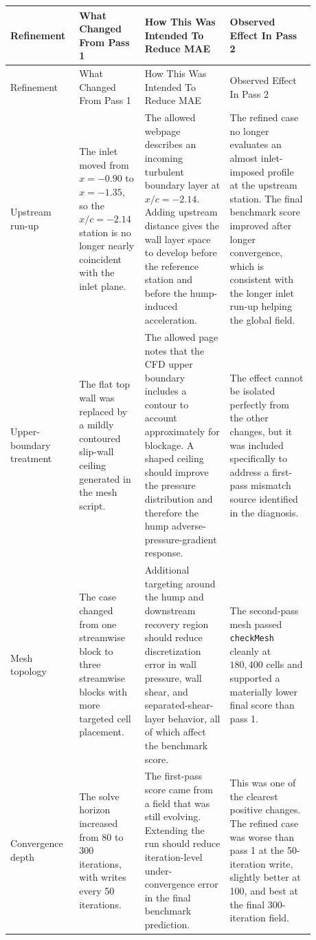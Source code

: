 \documentclass[11pt]{article}
\begin{document}
\begin{longtable}{p{0.18\linewidth} p{0.18\linewidth} p{0.26\linewidth} p{0.26\linewidth}}
\toprule
Refinement & What Changed From Pass 1 & How This Was Intended To Reduce MAE & Observed Effect In Pass 2 \\
\midrule
\endfirsthead
\toprule
Refinement & What Changed From Pass 1 & How This Was Intended To Reduce MAE & Observed Effect In Pass 2 \\
\midrule
\endhead
Upstream run-up & The inlet moved from \(x=-0.90\) to \(x=-1.35\), so the \(x/c=-2.14\) station is no longer nearly coincident with the inlet plane. & The allowed webpage describes an incoming turbulent boundary layer at \(x/c=-2.14\). Adding upstream distance gives the wall layer space to develop before the reference station and before the hump-induced acceleration. & The refined case no longer evaluates an almost inlet-imposed profile at the upstream station. The final benchmark score improved after longer convergence, which is consistent with the longer inlet run-up helping the global field. \\
Upper-boundary treatment & The flat top wall was replaced by a mildly contoured slip-wall ceiling generated in the mesh script. & The allowed page notes that the CFD upper boundary includes a contour to account approximately for blockage. A shaped ceiling should improve the pressure distribution and therefore the hump adverse-pressure-gradient response. & The effect cannot be isolated perfectly from the other changes, but it was included specifically to address a first-pass mismatch source identified in the diagnosis. \\
Mesh topology & The case changed from one streamwise block to three streamwise blocks with more targeted cell placement. & Additional targeting around the hump and downstream recovery region should reduce discretization error in wall pressure, wall shear, and separated-shear-layer behavior, all of which affect the benchmark score. & The second-pass mesh passed \texttt{checkMesh} cleanly at \(180{,}400\) cells and supported a materially lower final score than pass 1. \\
Convergence depth & The solve horizon increased from 80 to 300 iterations, with writes every 50 iterations. & The first-pass score came from a field that was still evolving. Extending the run should reduce iteration-level under-convergence error in the final benchmark prediction. & This was one of the clearest positive changes. The refined case was worse than pass 1 at the 50-iteration write, slightly better at 100, and best at the final 300-iteration field. \\

\end{longtable}
\end{document}
